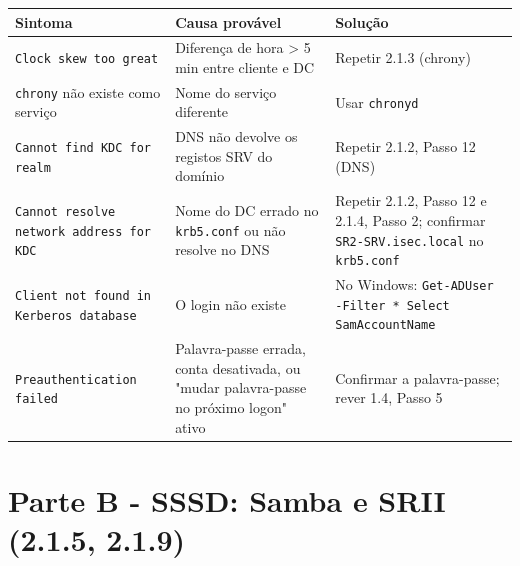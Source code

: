 \begin{center}\small
\begin{tabularx}{\linewidth}{|>{\raggedright\arraybackslash}X|>{\raggedright\arraybackslash}X|>{\raggedright\arraybackslash}X|}
\hline
\rowcolor{azul!10}\textbf{Sintoma} & \textbf{Causa provável} & \textbf{Solução} \\
\hline
\texttt{Clock skew too great} & Diferença de hora \textgreater{} 5 min entre cliente e DC & Repetir 2.1.3 (chrony) \\
\hline
\texttt{chrony} não existe como serviço & Nome do serviço diferente & Usar \texttt{chronyd} \\
\hline
\texttt{Cannot find KDC for realm} & DNS não devolve os registos SRV do domínio & Repetir 2.1.2, Passo 12 (DNS) \\
\hline
\texttt{Cannot resolve network address for KDC} & Nome do DC errado no \texttt{krb5.conf} ou não resolve no DNS & Repetir 2.1.2, Passo 12 e 2.1.4, Passo 2; confirmar \texttt{SR2-SRV.isec.local} no \texttt{krb5.conf} \\
\hline
\texttt{Client not found in Kerberos database} & O login não existe & No Windows: \texttt{Get-ADUser -Filter * \textbar{} Select SamAccountName} \\
\hline
\texttt{Preauthentication failed} & Palavra-passe errada, conta desativada, ou "mudar palavra-passe no próximo logon" ativo & Confirmar a palavra-passe; rever 1.4, Passo 5 \\
\hline
\end{tabularx}
\end{center}

\label{ec-b1-samba}

\section*{Parte B - SSSD: Samba e SRII (2.1.5, 2.1.9)}

